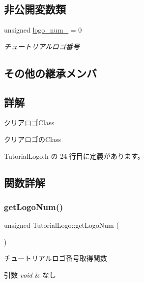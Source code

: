 \subsection*{非公開変数類}
\begin{DoxyCompactItemize}
\item 
unsigned \mbox{\hyperlink{class_tutorial_logo_a8027b42e33a036e88277c4cd17fabdaa}{logo\+\_\+num\+\_\+}} = 0
\begin{DoxyCompactList}\small\item\em チュートリアルロゴ番号 \end{DoxyCompactList}\end{DoxyCompactItemize}
\subsection*{その他の継承メンバ}


\subsection{詳解}
クリアロゴ\+Class 

クリアロゴの\+Class 

 Tutorial\+Logo.\+h の 24 行目に定義があります。



\subsection{関数詳解}
\mbox{\label{class_tutorial_logo_ada533e278273685d3de1a29742a6b7f0}} 
\subsubsection{\texorpdfstring{get\+Logo\+Num()}{getLogoNum()}}
{\footnotesize\ttfamily unsigned Tutorial\+Logo\+::get\+Logo\+Num (\begin{DoxyParamCaption}{ }\end{DoxyParamCaption})}



チュートリアルロゴ番号取得関数 


\begin{DoxyParams}{引数}
{\em void} & なし \\
\hline
\end{DoxyParams}

